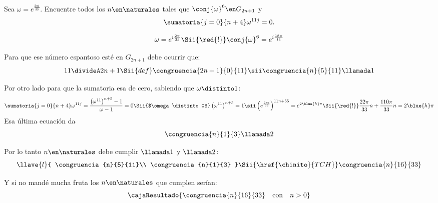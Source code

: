 \begin{enunciado}{\ejExtra}
  Sea $\omega = e^{\frac{2\pi i}{33}}$. Encuentre todos los $n \en \naturales$ tales que
  $\conj{\omega}^6 \en G_{2n+1}$ y
  $$
    \sumatoria{j=0}{n+4} \omega^{11j} = 0.
  $$
\end{enunciado}

$$
  \omega = e^{i\frac{2\pi }{33}}
  \Sii{\red{!}}
  \conj{\omega}^6 = e^{i\frac{18\pi }{11}}
$$

Para que ese número espantoso esté en $G_{2n+1}$ debe ocurrir que:
$$
  11 \divideA 2n+1
  \Sii{def}
  \congruencia{2n+1}{0}{11}
  \sii
  \congruencia{n}{5}{11} \llamada1
$$

Por otro lado para que la sumatoria esa de cero, sabiendo que $\omega \distinto 1$:
$$
  \sumatoria{j=0}{n+4} \omega^{11j}
  =
  \frac{\left(\omega^{11} \right)^{n + 5} - 1}{\omega - 1} = 0
  \Sii{$\omega \distinto 0$}
  \left(\omega^{11} \right)^{n + 5} = 1
  \sii
  \left(e^{\frac{2\pi i}{33}}\right)^{11n + 55} = e^{2\blue{h}\pi}
  \Sii{\red{!}}
  \frac{22\pi}{33}n + \frac{110\pi}{33}n = 2\blue{h}\pi
$$
Esa última ecuación da
$$
  \congruencia{n}{1}{3} \llamada2
$$

Por lo tanto $n \en \naturales$ debe cumplir $\llamada1$ y $\llamada2$:
$$
  \llave{l}{
    \congruencia{n}{5}{11}\\
    \congruencia{n}{1}{3}
  }
  \Sii{\href{\chinito}{TCH}}
  \congruencia{n}{16}{33}
$$

Y si no mandé mucha fruta los $n \en \naturales$ que cumplen serían:
$$
  \cajaResultado{
    \congruencia{n}{16}{33}
    \quad \text{con} \quad
    n > 0
  }
$$

\begin{aportes}
  \item {}
\end{aportes}
